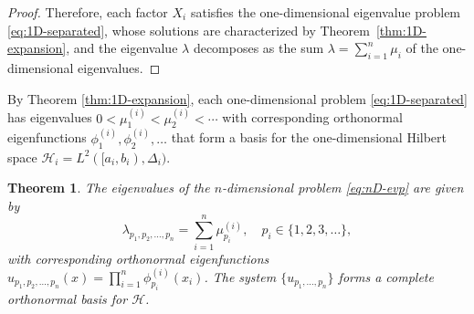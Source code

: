 \documentclass{article}
\newtheorem{theorem}{Theorem}[section]
\numberwithin{equation}{section}
\numberwithin{theorem}{section}
\begin{document}
\begin{proof}
Therefore, each factor $X_i$ satisfies the one-dimensional eigenvalue problem \eqref{eq:1D-separated}, whose solutions are characterized by Theorem~\ref{thm:1D-expansion}, and the eigenvalue $\lambda$ decomposes as the sum $\lambda = \displaystyle\sum_{i=1}^{n} \mu_i$ of the one-dimensional eigenvalues.
\end{proof}

By Theorem \ref{thm:1D-expansion}, each one-dimensional problem \eqref{eq:1D-separated} has eigenvalues $0 < \mu_1^{(i)} < \mu_2^{(i)} < \cdots$ with corresponding orthonormal eigenfunctions $\phi_1^{(i)}, \phi_2^{(i)}, \ldots$ that form a basis for the one-dimensional Hilbert space $\mathscr{H}_i = L^2([a_i, b_i), \Delta_i)$.

\begin{theorem}\label{thm:nD-basis}
The eigenvalues of the $n$-dimensional problem \eqref{eq:nD-evp}  are given by
\[\lambda_{p_1, p_2, \ldots, p_n} = \sum_{i=1}^{n} \mu_{p_i}^{(i)}, \quad p_i \in \{1, 2, 3, \ldots\},\]
with corresponding orthonormal eigenfunctions
$u_{p_1, p_2, \ldots, p_n}(x) = \displaystyle\prod_{i=1}^{n} \phi_{p_i}^{(i)}(x_i)$. The system $\{u_{p_1, \ldots, p_n}\}$ forms a complete orthonormal basis for $\mathscr{H}$.
\end{theorem}
\end{document}
